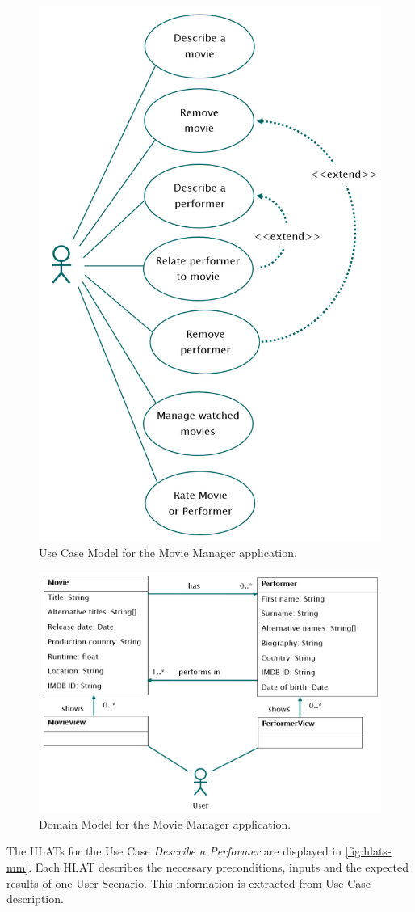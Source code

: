 \begin{figure}[H]
	\centering
	\includegraphics[width=.5\textwidth]{../images/ElAttarUseCase.png}
	\caption{Use Case Model for the Movie Manager application.}
	\label{fig:use-case-mm}
\end{figure}



\begin{figure}[H]
	\centering
	\includegraphics[width=.8\textwidth]{../images/ElAttarDomain.png}
	\caption{Domain Model for the Movie Manager application.}
	\label{fig:domain-mm}
\end{figure}



The HLATs for the Use Case \textit{Describe a Performer} are displayed in \autoref{fig:hlats-mm}.
Each HLAT describes the necessary preconditions, inputs and the expected results of one User Scenario.
This information is extracted from Use Case description.

